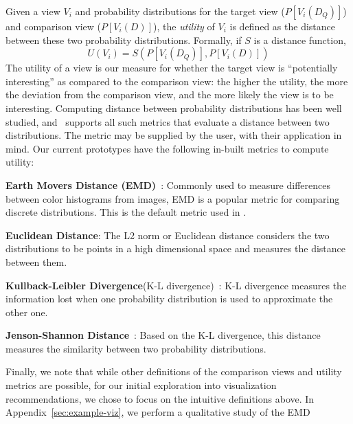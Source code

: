 Given a view $V_i$ and probability distributions for the
target view  ($P[V_i (D_Q)]$) and comparison view ($P[V_i (D)]$), the
{\em utility} of $V_i$ is defined as the distance between these two probability
distributions. Formally, if $S$ is a distance function,
$$ U (V_i) = S ( P[V_i (D_Q)], P[V_i (D)] )$$
The utility of a view is our measure for whether the target view is
``potentially interesting'' as compared to the comparison view:
the higher the utility, the more the deviation
from the comparison view, and the more likely the view is to be interesting.
Computing distance between probability distributions has
been well studied, and \VizRecDB\ supports all such
metrics that evaluate a distance between two distributions.
The metric may be supplied by the user, with their
application in mind.
Our current prototypes have the following in-built metrics
to compute utility:
\begin{denselist}
  \item {\bf Earth Movers Distance (EMD)}~\cite{wikipedia-prob-dist}: Commonly used to
  measure differences between color histograms from images, EMD is a popular metric for comparing
  discrete distributions. This is the default metric used in \VizRecDB.
  \item {\bf Euclidean Distance}: The L2 norm or
  Euclidean distance considers the two distributions to be points in a high
  dimensional space and measures the distance between them.
  \item {\bf Kullback-Leibler Divergence}(K-L divergence)~\cite{wikipedia-KL}:
  K-L divergence measures the information lost when one probability distribution is used to approximate
  the other one.
  \item {\bf Jenson-Shannon Distance}~\cite{wikipedia-JS,entropy-vis}: Based on
  the K-L divergence, this distance measures the similarity between two probability distributions.
\end{denselist}
Finally, we note that while other definitions of the comparison views and
utility metrics are possible, for our initial exploration into 
visualization recommendations, we chose to focus on the intuitive definitions above.
In Appendix~\ref{sec:example-viz}, we perform a qualitative study of the EMD
